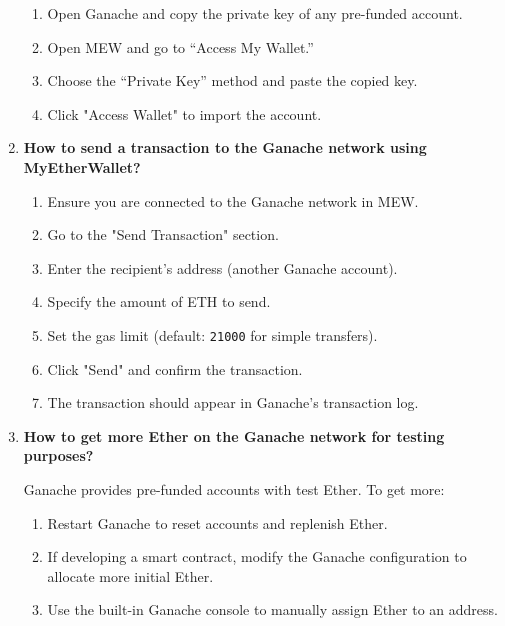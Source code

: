 \documentclass[11pt]{article}
\begin{document}
\begin{enumerate}
    \begin{enumerate}
        \item Open Ganache and copy the private key of any pre-funded account.
        \item Open MEW and go to “Access My Wallet.”
        \item Choose the “Private Key” method and paste the copied key.
        \item Click "Access Wallet" to import the account.
    \end{enumerate}

    \item \textbf{How to send a transaction to the Ganache network using MyEtherWallet?}
    
    \begin{enumerate}
        \item Ensure you are connected to the Ganache network in MEW.
        \item Go to the "Send Transaction" section.
        \item Enter the recipient’s address (another Ganache account).
        \item Specify the amount of ETH to send.
        \item Set the gas limit (default: \texttt{21000} for simple transfers).
        \item Click "Send" and confirm the transaction.
        \item The transaction should appear in Ganache’s transaction log.
    \end{enumerate}

    \item \textbf{How to get more Ether on the Ganache network for testing purposes?}
    
    Ganache provides pre-funded accounts with test Ether. To get more:
    
    \begin{enumerate}
        \item Restart Ganache to reset accounts and replenish Ether.
        \item If developing a smart contract, modify the Ganache configuration to allocate more initial Ether.
        \item Use the built-in Ganache console to manually assign Ether to an address.
    \end{enumerate}

\end{enumerate}
\end{document}

